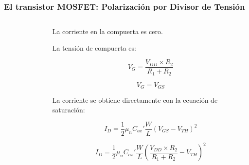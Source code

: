 \begin{frame}[t]
    \frametitle{El transistor MOSFET: Polarización por Divisor de Tensión}

    \begin{columns}
        \begin{column}{0.5\textwidth}
            \begin{figure}[H]
                \centering
            \end{figure}
        \end{column}
        \begin{column}{0.5\textwidth}
            La corriente en la compuerta es cero.

            \vspace{3mm}
            La tensión de compuerta es:

            \[ V_G = \dfrac{V_{DD} \times R_2}{R_1 + R_2} \]

            \[ V_G = V_{GS} \]

            \vspace{3mm}
            La corriente se obtiene directamente con la ecuación de saturación:

            \[ I_D = \dfrac{1}{2} \mu_n C_{ox}' \dfrac{W}{L} (V_{GS}-V_{TH})^2 \]

            \[ I_D = \dfrac{1}{2} \mu_n C_{ox}' \dfrac{W}{L} \left( \dfrac{V_{DD} \times R_2}{R_1 + R_2}-V_{TH} \right)^2 \]
        \end{column}
    \end{columns}
\end{frame}

